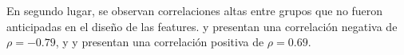 En segundo lugar, se observan correlaciones altas entre grupos que 
no fueron anticipadas en el diseño de las features. 
 y  presentan 
una correlación negativa de $\rho = -0.79$, y 
 y  presentan 
una correlación positiva de $\rho = 0.69$. 

